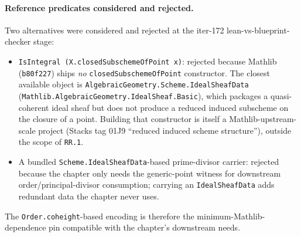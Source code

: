 \begin{definition}
  \paragraph{Reference predicates considered and rejected.}
  Two alternatives were considered and rejected at the iter-172
  lean-vs-blueprint-checker stage:
  \begin{itemize}
    \item \texttt{IsIntegral\ (X.closedSubschemeOfPoint\ x)}: rejected
      because Mathlib (\texttt{b80f227}) ships \emph{no}
      \texttt{closedSubschemeOfPoint} constructor. The closest available
      object is \texttt{AlgebraicGeometry.Scheme.IdealSheafData}
      (\texttt{Mathlib.AlgebraicGeometry.IdealSheaf.Basic}), which packages
      a quasi-coherent ideal sheaf but does not produce a reduced induced
      subscheme on the closure of a point. Building that constructor is
      itself a Mathlib-upstream-scale project (Stacks tag 01J9 ``reduced
      induced scheme structure''), outside the scope of \texttt{RR.1}.
    \item A bundled \texttt{Scheme.IdealSheafData}-based prime-divisor
      carrier: rejected because the chapter only needs the generic-point
      witness for downstream order/principal-divisor consumption; carrying
      an \texttt{IdealSheafData} adds redundant data the chapter never
      uses.
  \end{itemize}
  The \texttt{Order.coheight}-based encoding is therefore the
  minimum-Mathlib-dependence pin compatible with the chapter's downstream
  needs.
\end{definition}
